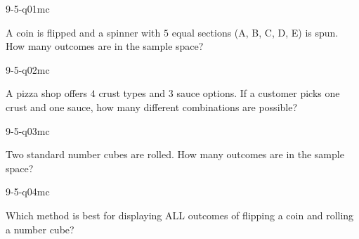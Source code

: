 

\begin{practiceQuestion}{9-5-q01}{mc}
\begin{questionText}
A coin is flipped and a spinner with $5$ equal sections (A, B, C, D, E) is spun. How many outcomes are in the sample space?
\end{questionText}
\end{practiceQuestion}

\begin{practiceQuestion}{9-5-q02}{mc}
\begin{questionText}
A pizza shop offers $4$ crust types and $3$ sauce options. If a customer picks one crust and one sauce, how many different combinations are possible?
\end{questionText}
\end{practiceQuestion}

\begin{practiceQuestion}{9-5-q03}{mc}
\begin{questionText}
Two standard number cubes are rolled. How many outcomes are in the sample space?
\end{questionText}
\end{practiceQuestion}

\begin{practiceQuestion}{9-5-q04}{mc}
\begin{questionText}
Which method is best for displaying ALL outcomes of flipping a coin and rolling a number cube?
\end{questionText}
\end{practiceQuestion}

